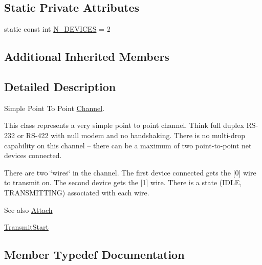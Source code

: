 \subsection*{Static Private Attributes}
\begin{DoxyCompactItemize}
\item 
static const int \hyperlink{classns3_1_1PointToPointChannel_aa40520f14e7c17c01a563f5d89f67d5b}{N\+\_\+\+D\+E\+V\+I\+C\+ES} = 2
\end{DoxyCompactItemize}
\subsection*{Additional Inherited Members}


\subsection{Detailed Description}
Simple Point To Point \hyperlink{classns3_1_1Channel}{Channel}. 

This class represents a very simple point to point channel. Think full duplex R\+S-\/232 or R\+S-\/422 with null modem and no handshaking. There is no multi-\/drop capability on this channel -- there can be a maximum of two point-\/to-\/point net devices connected.

There are two \char`\"{}wires\char`\"{} in the channel. The first device connected gets the \mbox{[}0\mbox{]} wire to transmit on. The second device gets the \mbox{[}1\mbox{]} wire. There is a state (I\+D\+LE, T\+R\+A\+N\+S\+M\+I\+T\+T\+I\+NG) associated with each wire.

\begin{DoxySeeAlso}{See also}
\hyperlink{classns3_1_1PointToPointChannel_a5238f81b5b44d1278e4f016c883f6482}{Attach} 

\hyperlink{classns3_1_1PointToPointChannel_ad3032b1fa7e3e046ccd0bc7e1b5de80b}{Transmit\+Start} 
\end{DoxySeeAlso}


\subsection{Member Typedef Documentation}
